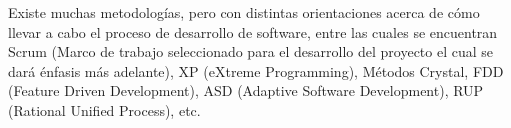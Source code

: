 Existe muchas metodologías, pero con distintas orientaciones acerca de cómo llevar a cabo el proceso de desarrollo de software, entre las cuales se encuentran Scrum (Marco de trabajo seleccionado para el desarrollo del proyecto el cual se dará énfasis más adelante), XP (eXtreme Programming), Métodos Crystal, FDD (Feature Driven Development), ASD (Adaptive Software Development), RUP (Rational Unified Process), etc.